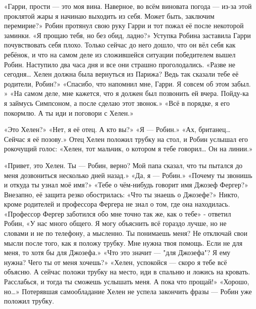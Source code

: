 \documentclass[a4paper,12pt]{book}
\begin{document}
	«Гарри, прости — это моя вина. Наверное, во всём виновата погода — из-за этой проклятой жары я начинаю выходить из себя. Может быть, заключим перемирие?»
	Робин протянул свою руку Гарри и тот пожал её после некоторой заминки.
	«Я прощаю тебя, но без обид, ладно?»
	Уступка Робина заставила Гарри почувствовать себя плохо. Только сейчас до него дошло, что он вёл себя как ребёнок, и что на самом деле из сложившейся ситуации победителем вышел Робин.
	Наступило два часа дня и все они страшно проголодались.
	«Разве не сегодня… Хелен должна была вернуться из Парижа? Ведь так сказали тебе её родители, Робин?»
	«Спасибо, что напомнил мне, Гарри. Я совсем об этом забыл. »
	«На самом деле, мне кажется, что я должен был позвонить ей вчера. Пойду-ка я займусь Симпсоном, а после сделаю этот звонок.»
	«Всё в порядке, я его покормлю. А ты иди и поговори с Хелен.»

	«Это Хелен?»
	«Нет, я её отец. А кто вы?»
	«Я — Робин.»
	«Ах, британец… Сейчас я её позову.»
	Отец Хелен положил трубку на стол, и Робин услышал его рокочущий голос:
	«Хелен, тот мальчик, о котором я тебе говорил… Он на линии.»

	«Привет, это Хелен. Ты — Робин, верно? Мой папа сказал, что ты пытался до меня дозвониться несколько дней назад.»
	«Да, я — Робин.»
	«Почему ты звонишь и откуда ты узнал моё имя?»
	«Тебе о чём-нибудь говорит имя Джозеф Фергер?»
	Внезапно, её защита резко обострилась:
	«Что ты знаешь о Джозефе?»
	Никто, кроме родителей и профессора Фергера не знал о том, где она находилась.
	«Профессор Фергер заботился обо мне точно так же, как о тебе» - ответил Робин,
	«У нас много общего. Я могу объяснить всё гораздо лучше, но не словами и не по телефону, а мысленно. Ты понимаешь меня? Не отключай свои мысли после того, как я положу трубку. Мне нужна твоя помощь. Если не для меня, то хотя бы для Джозефа.»
	«Что это значит — "для Джозефа"? Я ему нужна? Чего ты от меня хочешь?»
	«Хелен, успокойся — скоро я тебе всё объясню. А сейчас положи трубку на место, иди в спальню и ложись на кровать. Расслабься, и тогда ты сможешь услышать меня. А пока что прощай!»
	«Хорошо, но…»
	Потерявшая самообладание Хелен не успела закончить фразы — Робин уже положил трубку.
\end{document}
